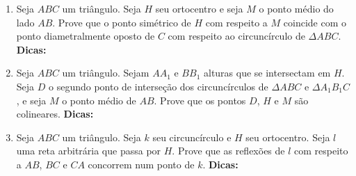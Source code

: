 \documentclass{article}
\newcommand{\dica}{\textbf{Dicas:}}
\newcommand{\iniTri}{Seja $ABC$ um triângulo}
\begin{document}
\begin{multicols}{2}
\begin{enumerate}
    \item \iniTri. Seja $H$ seu ortocentro e seja $M$ o ponto médio do lado $AB$. Prove que o ponto simétrico de $H$ com respeito a $M$ coincide com o ponto diametralmente oposto de $C$ com respeito ao circuncírculo de $\Delta ABC$. \dica %
    
    \item \iniTri. Sejam $AA_1$ e $BB_1$ alturas que se intersectam em $H$. Seja $D$ o segundo ponto de interseção dos circuncírculos de $\Delta ABC$ e $\Delta A_1B_1C$, e seja $M$ o ponto médio de $AB$. Prove que os pontos $D$, $H$ e $M$ são colineares. \dica %
    
    \item \iniTri. Seja $k$ seu circuncírculo e $H$ seu ortocentro. Seja $l$ uma reta arbitrária que passa por $H$. Prove que as reflexões de $l$ com respeito a $AB$, $BC$ e $CA$ concorrem num ponto de $k$. \dica %
    
    
    
    
    
    
    
    
    
    
    
    
    
    
    
    
\end{enumerate}
\end{multicols}
\end{document}
